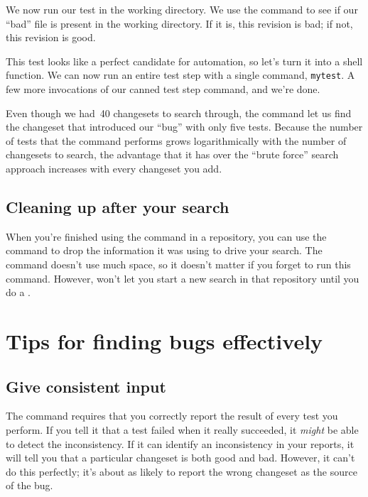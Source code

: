 We now run our test in the working directory.  We use the
 command to see if our ``bad'' file is present in the
working directory.  If it is, this revision is bad; if not, this
revision is good.

This test looks like a perfect candidate for automation, so let's turn
it into a shell function.
We can now run an entire test step with a single command,
\texttt{mytest}.
A few more invocations of our canned test step command, and we're
done.

Even though we had~40 changesets to search through, the 
command let us find the changeset that introduced our ``bug'' with
only five tests.  Because the number of tests that the 
command performs grows logarithmically with the number of changesets to
search, the advantage that it has over the ``brute force'' search
approach increases with every changeset you add.

\subsection{Cleaning up after your search}

When you're finished using the  command in a
repository, you can use the  command to drop
the information it was using to drive your search.  The command
doesn't use much space, so it doesn't matter if you forget to run this
command.  However,  won't let you start a new search in
that repository until you do a .

\section{Tips for finding bugs effectively}

\subsection{Give consistent input}

The  command requires that you correctly report the
result of every test you perform.  If you tell it that a test failed
when it really succeeded, it \emph{might} be able to detect the
inconsistency.  If it can identify an inconsistency in your reports,
it will tell you that a particular changeset is both good and bad.
However, it can't do this perfectly; it's about as likely to report
the wrong changeset as the source of the bug.

